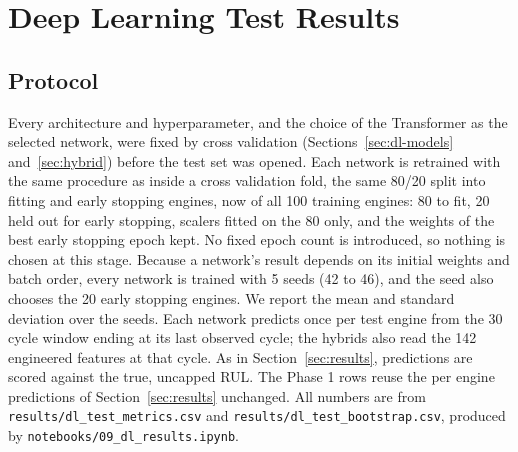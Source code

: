 \section{Deep Learning Test Results}
\label{sec:dl-results}

\subsection{Protocol}
Every architecture and hyperparameter, and the choice of the Transformer as
the selected network, were fixed by cross validation
(Sections~\ref{sec:dl-models} and~\ref{sec:hybrid}) before the test set was
opened. Each network is retrained with the same procedure as inside a
cross validation fold, the same 80/20 split into fitting and early stopping
engines, now of all 100 training engines: 80 to fit, 20 held out for early
stopping, scalers fitted on the 80 only, and the weights of the best early
stopping epoch kept. No fixed
epoch count is introduced, so nothing is chosen at this stage. Because a
network's result depends on its initial weights and batch order, every
network is trained with 5 seeds (42 to 46), and the seed also chooses the 20
early stopping engines. We report the mean and standard deviation over the
seeds. Each network predicts once per test engine from the 30 cycle window
ending at its last observed cycle; the hybrids also read the 142 engineered
features at that cycle. As in Section~\ref{sec:results}, predictions are
scored against the true, uncapped RUL. The Phase 1 rows reuse the per engine
predictions of Section~\ref{sec:results} unchanged. All numbers are from
\texttt{results/dl\_test\_metrics.csv} and
\texttt{results/dl\_test\_bootstrap.csv}, produced by
\texttt{notebooks/09\_dl\_results.ipynb}.

